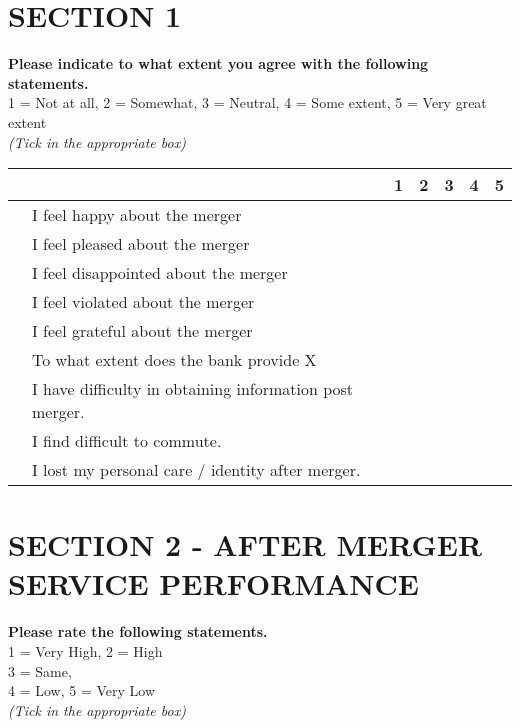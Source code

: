 \documentclass[10pt,a4paper]{article}
\newcounter{magicrownumbers}
\newcommand\rownumber{\stepcounter{magicrownumbers}\arabic{magicrownumbers}}
\newcommand \tab[1][1cm]{\hspace*{#1}}
\begin{document}
{\selectfont
\section*{SECTION 1}
\textbf{Please indicate to what extent you agree with the following statements.} \\
1 = Not at all, 2 = Somewhat, 3 = Neutral, 4 = Some extent, 5 = Very great extent\\
\emph {(Tick in the appropriate box)}\\
\begin{minipage}{\textwidth}

\begin{tabular}{|c|l|c|c|c|c|c|}
\hline \multicolumn{2}{|c|}{} & 1 & 2 & 3 & 4 & 5\\
\hline \rownumber & I feel happy about the merger & \tab & \tab & \tab & \tab & \tab \\
\hline \rownumber & I feel pleased about the merger & \tab & \tab & \tab & \tab & \tab \\
\hline \rownumber & I feel disappointed about the merger & \tab & \tab & \tab & \tab & \tab \\
\hline \rownumber & I feel violated about the merger & \tab & \tab & \tab & \tab & \tab \\
\hline \rownumber & I feel grateful about the merger & \tab & \tab & \tab & \tab & \tab \\
\hline \rownumber & To what extent does the bank provide X  & \tab & \tab & \tab & \tab & \tab \\
\hline \rownumber & I have difficulty in obtaining information post merger. & \tab & \tab & \tab & \tab & \tab \\
\hline \rownumber & I find difficult to commute. & \tab & \tab & \tab & \tab & \tab \\
\hline \rownumber & I lost my personal care / identity after merger. & \tab & \tab & \tab & \tab & \tab \\
\hline
\end{tabular}

\end{minipage}

\newpage
\section*{SECTION 2 - AFTER MERGER SERVICE PERFORMANCE}
\textbf{Please rate the following statements.}\\
1 = Very High, 2 = High\\
3 = Same,\\
4 = Low, 5 = Very Low\\
\emph {(Tick in the appropriate box)}\\
\begin{minipage}{\textwidth}


\end{minipage}}
\end{document}
